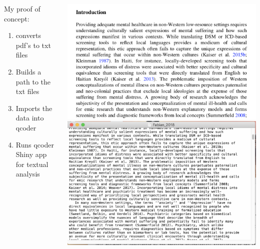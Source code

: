 \documentclass[unknownkeysallowed,usepdftitle=false, parskip=full]{beamer}
\newcommand{\secvariable}{nothing}
\begin{document}
\begin{frame}\label{\secvariable}
  \begin{columns}[t]
    \begin{column}[c]{0.45\textwidth}
    \parbox{\linewidth}{

      
      
      My proof of concept:
      \begin{enumerate}
          \item converts pdf's to txt files 
          \item Builds a path to the txt files 
          \item Imports the data into qcoder 
          \item Runs qcoder Shiny app for textual analysis
      \end{enumerate}
   
      }
    \end{column}
    \begin{column}[c]{0.45\textwidth}
\includegraphics[width=1\textwidth,height=0.5\textheight,keepaspectratio]{figure7.png}\\
\vspace{12pt}
\includegraphics[width=1\textwidth,height=0.5\textheight,keepaspectratio]{figure8.png}
    \end{column}
  \end{columns}

  
\end{frame}
\end{document}
